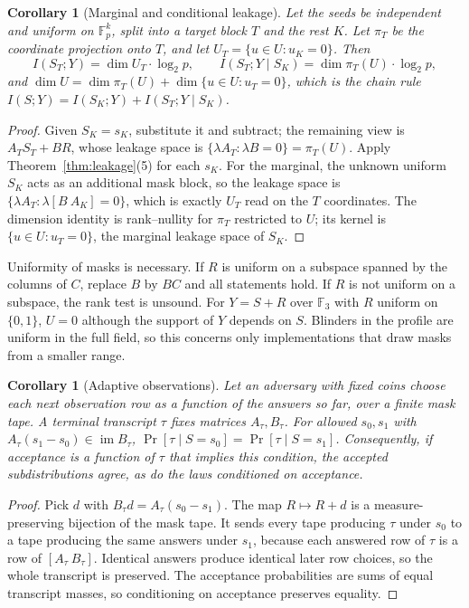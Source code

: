 \documentclass[pdflatex,sn-mathphys-num]{sn-jnl}
\theoremstyle{plain}
\newtheorem{corollary}[theorem]{Corollary}
\theoremstyle{definition}
\newcommand{\F}{\mathbb{F}}
\newcommand{\im}{\operatorname{im}}
\begin{document}
\begin{corollary}[Marginal and conditional leakage]\label{cor:condleak}
Let the seeds be independent and uniform on $\F_p^k$, split into a target block $T$ and the rest $K$. Let $\pi_T$ be the coordinate projection onto $T$, and let $U_{T}=\{u\in U:u_K=0\}$. Then
\[
 I(S_T;Y)=\dim U_T\cdot\log_2p,\qquad I(S_T;Y\mid S_K)=\dim\pi_T(U)\cdot\log_2p,
\]
and $\dim U=\dim\pi_T(U)+\dim\{u\in U:u_T=0\}$, which is the chain rule $I(S;Y)=I(S_K;Y)+I(S_T;Y\mid S_K)$.
\end{corollary}
\begin{proof}
Given $S_K=s_K$, substitute it and subtract; the remaining view is $A_TS_T+BR$, whose leakage space is $\{\lambda A_T:\lambda B=0\}=\pi_T(U)$. Apply Theorem~\ref{thm:leakage}(5) for each $s_K$. For the marginal, the unknown uniform $S_K$ acts as an additional mask block, so the leakage space is $\{\lambda A_T:\lambda[B\ A_K]=0\}$, which is exactly $U_T$ read on the $T$ coordinates. The dimension identity is rank--nullity for $\pi_T$ restricted to $U$; its kernel is $\{u\in U:u_T=0\}$, the marginal leakage space of $S_K$.
\end{proof}

Uniformity of masks is necessary. If $R$ is uniform on a subspace spanned by the columns of $C$, replace $B$ by $BC$ and all statements hold. If $R$ is not uniform on a subspace, the rank test is unsound. For $Y=S+R$ over $\F_3$ with $R$ uniform on $\{0,1\}$, $U=0$ although the support of $Y$ depends on $S$. Blinders in the profile are uniform in the full field, so this concerns only implementations that draw masks from a smaller range.

\begin{corollary}[Adaptive observations]\label{cor:adaptive}
Let an adversary with fixed coins choose each next observation row as a function of the answers so far, over a finite mask tape. A terminal transcript $\tau$ fixes matrices $A_\tau,B_\tau$. For allowed $s_0,s_1$ with $A_\tau(s_1-s_0)\in\im B_\tau$, $\Pr[\tau\mid S=s_0]=\Pr[\tau\mid S=s_1]$. Consequently, if acceptance is a function of $\tau$ that implies this condition, the accepted subdistributions agree, as do the laws conditioned on acceptance.
\end{corollary}
\begin{proof}
Pick $d$ with $B_\tau d=A_\tau(s_0-s_1)$. The map $R\mapsto R+d$ is a measure-preserving bijection of the mask tape. It sends every tape producing $\tau$ under $s_0$ to a tape producing the same answers under $s_1$, because each answered row of $\tau$ is a row of $[A_\tau\ B_\tau]$. Identical answers produce identical later row choices, so the whole transcript is preserved. The acceptance probabilities are sums of equal transcript masses, so conditioning on acceptance preserves equality.
\end{proof}
\end{document}
